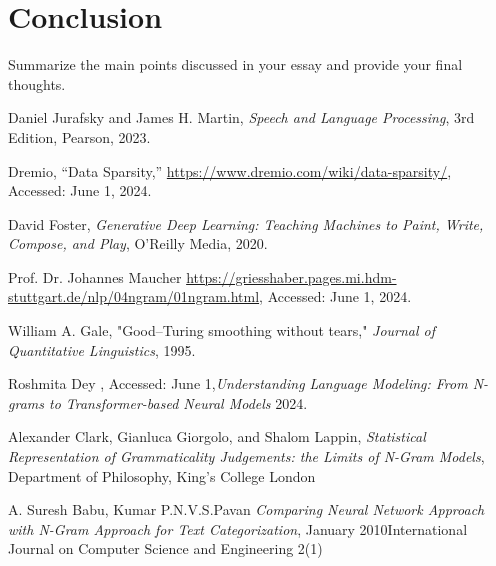 \documentclass[12pt]{article}
\begin{document}
\section{Conclusion}
Summarize the main points discussed in your essay and provide your final thoughts.

\clearpage
\begin{thebibliography}{9}

	Daniel Jurafsky and James H. Martin, \textit{Speech and Language Processing}, 3rd Edition, Pearson, 2023.

	Dremio, ``Data Sparsity,'' \url{https://www.dremio.com/wiki/data-sparsity/}, Accessed: June 1, 2024.

	David Foster, \textit{Generative Deep Learning: Teaching Machines to Paint, Write, Compose, and Play}, O'Reilly Media, 2020.

	Prof. Dr. Johannes Maucher \url{https://griesshaber.pages.mi.hdm-stuttgart.de/nlp/04ngram/01ngram.html}, Accessed: June 1, 2024.

	William A. Gale, "Good–Turing smoothing without tears," \textit{Journal of Quantitative Linguistics}, 1995.

	Roshmita Dey , Accessed: June 1,\textit{Understanding Language Modeling: From N-grams to Transformer-based Neural Models} 2024.

	Alexander Clark, Gianluca Giorgolo, and Shalom Lappin, \textit{Statistical Representation of Grammaticality Judgements: the Limits of
		N-Gram Models}, Department of Philosophy, King’s College London

	A. Suresh Babu, Kumar P.N.V.S.Pavan
	\textit{Comparing Neural Network Approach with N-Gram Approach for Text Categorization},     January 2010International Journal on Computer Science and Engineering 2(1)

\end{thebibliography}
\end{document}
